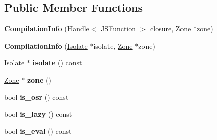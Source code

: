 \subsection*{Public Member Functions}
\begin{DoxyCompactItemize}
\item 
\hypertarget{classv8_1_1internal_1_1_compilation_info_af9b9a697bf174826c8c5060abcab94bf}{}{\bfseries Compilation\+Info} (\hyperlink{classv8_1_1internal_1_1_handle}{Handle}$<$ \hyperlink{classv8_1_1internal_1_1_j_s_function}{J\+S\+Function} $>$ closure, \hyperlink{classv8_1_1internal_1_1_zone}{Zone} $\ast$zone)\label{classv8_1_1internal_1_1_compilation_info_af9b9a697bf174826c8c5060abcab94bf}

\item 
\hypertarget{classv8_1_1internal_1_1_compilation_info_a80bf85f4c4d1c6f84c80abb56f3c890e}{}{\bfseries Compilation\+Info} (\hyperlink{classv8_1_1internal_1_1_isolate}{Isolate} $\ast$isolate, \hyperlink{classv8_1_1internal_1_1_zone}{Zone} $\ast$zone)\label{classv8_1_1internal_1_1_compilation_info_a80bf85f4c4d1c6f84c80abb56f3c890e}

\item 
\hypertarget{classv8_1_1internal_1_1_compilation_info_a2680ca8c04e2bac0aeaa768d1a61e3b3}{}\hyperlink{classv8_1_1internal_1_1_isolate}{Isolate} $\ast$ {\bfseries isolate} () const \label{classv8_1_1internal_1_1_compilation_info_a2680ca8c04e2bac0aeaa768d1a61e3b3}

\item 
\hypertarget{classv8_1_1internal_1_1_compilation_info_a2416ca850931efb9851086113e736420}{}\hyperlink{classv8_1_1internal_1_1_zone}{Zone} $\ast$ {\bfseries zone} ()\label{classv8_1_1internal_1_1_compilation_info_a2416ca850931efb9851086113e736420}

\item 
\hypertarget{classv8_1_1internal_1_1_compilation_info_ab5394def68b42add8b9c47fc831c828e}{}bool {\bfseries is\+\_\+osr} () const \label{classv8_1_1internal_1_1_compilation_info_ab5394def68b42add8b9c47fc831c828e}

\item 
\hypertarget{classv8_1_1internal_1_1_compilation_info_a7e4699d22f26dbe3c5a014da48a95efd}{}bool {\bfseries is\+\_\+lazy} () const \label{classv8_1_1internal_1_1_compilation_info_a7e4699d22f26dbe3c5a014da48a95efd}

\item 
\hypertarget{classv8_1_1internal_1_1_compilation_info_a264b7d0274b0273ce768c6a584accfa9}{}bool {\bfseries is\+\_\+eval} () const \label{classv8_1_1internal_1_1_compilation_info_a264b7d0274b0273ce768c6a584accfa9}


\end{DoxyCompactItemize}
